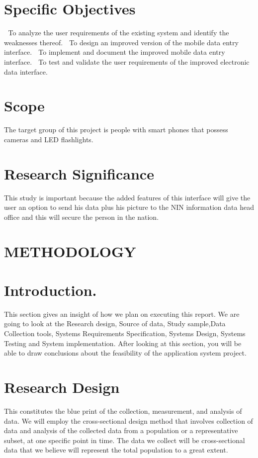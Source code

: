 \documentclass{article}
\begin{document}
\section{ Specific Objectives}
{
  To analyze the user requirements of the existing system and identify the weaknesses thereof.
  To design an improved version of the mobile data entry interface.
  To implement and document the improved mobile data entry interface.
  To test and validate the user requirements of the improved electronic data interface.
}

 \section{Scope}
{The target group of this project is people with smart phones that possess cameras and LED flashlights.
}

 \section{Research Significance}
{This study is important because the added features of this interface will give the user an option to send his data plus his picture to the NIN information data head office and this will secure the person in the nation.
}

    
\section{ METHODOLOGY}

\section{Introduction.}
{This section gives an insight of how we plan on executing this report. We are going to look at the Research design, Source of data, Study sample,Data Collection tools, Systems Requirements Specification, Systems Design, Systems Testing and System implementation. After looking at this section, you will be able to draw conclusions about the feasibility of the application system project}.
\section{Research Design} 
{This constitutes the blue print of the collection, measurement, and analysis of data. We will employ the cross-sectional design method that involves collection of data and analysis of the collected data from a population or a representative subset, at one specific point in time. The data we collect will be cross-sectional data that we believe will represent the total population to a great extent.}
\end{document}

